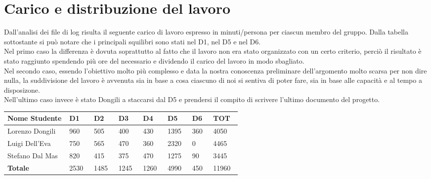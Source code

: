 \section{Carico e distribuzione del lavoro}

Dall’analisi dei file di log risulta il seguente carico di lavoro espresso in minuti/persona per ciascun membro del gruppo.
Dalla tabella sottostante si può notare che i principali squilibri sono stati nel D1, nel D5 e nel D6. \\
Nel primo caso la differenza è dovuta soprattutto al fatto che il lavoro non era stato organizzato con un certo criterio, perciò il risultato è stato raggiunto spendendo più ore del necessario e dividendo il carico del lavoro in modo sbagliato.\\
Nel secondo caso, essendo l'obiettivo molto più complesso e data la nostra conoscenza preliminare dell'argomento molto scarsa per non dire nulla, la suddivisione del lavoro è avvenuta sia in base a cosa ciascuno di noi si sentiva di poter fare, sia in base alle capacità e al tempo a disposizone.\\
Nell'ultimo caso invece è stato Dongili a staccarsi dal D5 e prendersi il compito di scrivere l'ultimo documento del progetto.\\
\begin{table}[ht]
    \centering
    \begin{tabular}{|m{0.2\linewidth}|m{0.05\linewidth}|m{0.05\linewidth}|m{0.05\linewidth}|m{0.05\linewidth}|m{0.05\linewidth}|m{0.05\linewidth}|m{0.05\linewidth}|}
    \hline
        \textbf{Nome Studente} & \textbf{D1} & \textbf{D2} & \textbf{D3} & \textbf{D4} & \textbf{D5} & \textbf{D6} & \textbf{TOT} \\
        \hline
        Lorenzo Dongili & 960 & 505 & 400 & 430 & 1395 & 360 & 4050 \\
        \hline
        Luigi Dell'Eva & 750 & 565 & 470 & 360 & 2320 & 0 & 4465 \\
        \hline
        Stefano Dal Mas & 820 & 415 & 375 & 470 & 1275 & 90 & 3445 \\
        \hline
        \textbf{Totale} & 2530 & 1485 & 1245 & 1260 & 4990 & 450 & 11960 \\
        \hline
    \end{tabular}
\end{table}